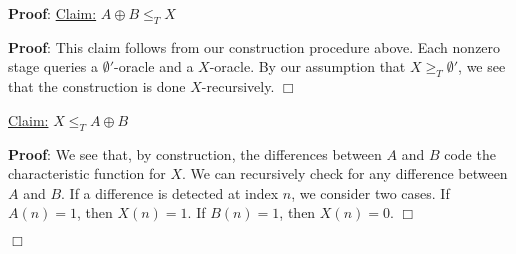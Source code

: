 \documentclass[11pt]{article}
\def\endproofmark{$\Box$}
\newenvironment{proof}{\par{\bf Proof}:}{\endproofmark\smallskip}
\begin{document}
\begin{proof}
  \underline{Claim:} $A \oplus B \leq_T X$
  \begin{proof}
    This claim follows from our construction procedure above. Each nonzero stage queries a $\emptyset'$-oracle and a $X$-oracle. By our assumption that $X \geq_T \emptyset'$, we see that the construction is done $X$-recursively.
  \end{proof} \newline
  
  \underline{Claim:} $X \leq_T A \oplus B$
  \begin{proof}
    We see that, by construction, the differences between $A$ and $B$ code the characteristic function for $X$. We can recursively check for any difference between $A$ and $B$. If a difference is detected at index $n$, we consider two cases. If $A(n) = 1$, then $X(n) = 1$. If $B(n) = 1$, then $X(n) = 0$.
  \end{proof}   
  
\end{proof}
\end{document}
